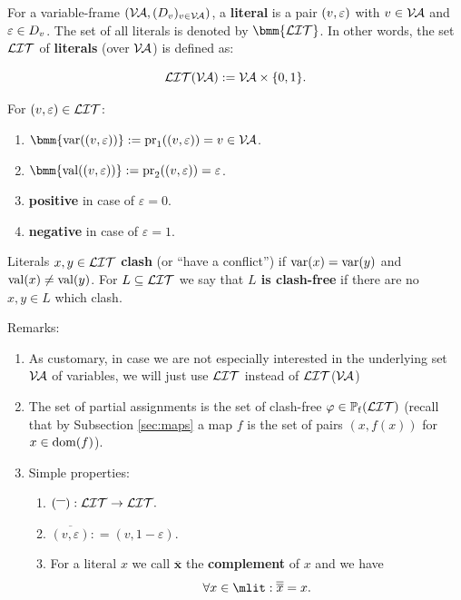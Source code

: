 \documentclass[12pt]{book}
\begin{document}
\begin{defi}\label{def:litdervar}
  For a variable-frame $(\mathcal{V\hspace{-0.1em}A}, (D_v)_{v \in \mathcal{V\hspace{-0.1em}A}})$, a \textbf{literal} is a pair $(v,\varepsilon)$ with $v \in \mathcal{V\hspace{-0.1em}A}$ and $\varepsilon \in D_v$. The set of all literals is denoted by $\bmm{\Lit}$. In other words, the set $\mathcal{LIT}$ of \textbf{literals} (over $\mathcal{V\hspace{-0.1em}A}$) is defined as:

\begin{displaymath}
 \mathcal{LIT}( \mathcal{V\hspace{-0.1em}A}): = \mathcal{V\hspace{-0.1em}A} \times \{0,1\}.
 \end{displaymath}

For $(v,\varepsilon) \in \mathcal{LIT}$:
  \begin{enumerate}
  \item $\bmm{\var((v,\ve))} := \proj_1((v,\ve)) = v \in \Va$.
  \item $\bmm{\val((v,\ve))} := \proj_2((v,\ve)) = \ve$.
  \item \textbf{positive} in case of $\varepsilon = 0$.
  \item \textbf{negative} in case of $\varepsilon = 1$.
  \end{enumerate}
  Literals $x, y \in \mathcal{LIT}$ \textbf{clash} (or ``have a conflict'') if $\operatorname{var}(x) = \operatorname{var}(y)$ and $\operatorname{val}(x) \ne \operatorname{val}(y)$. For $L \subseteq \mathcal{LIT}$ we say that \textbf{$L$ is clash-free} if there are no $x, y \in L$ which clash.
\end{defi}
Remarks:
\begin{enumerate}
\item As customary, in case we are not especially interested in the underlying set   $\mathcal{V\hspace{-0.1em}A}$ of variables, we will just use  $\mathcal{LIT}$ instead of $\mathcal{LIT}$($\mathcal{V\hspace{-0.1em}A}$)
\item The set of partial assignments is the set of clash-free $\varphi \in \operatorname{\mathbb{P}_f}(\mathcal{LIT})$ (recall that by Subsection \ref{sec:maps} a map $f$ is the set of pairs $(x,f(x))$ for $x \in \operatorname{dom}(f)$).

\item Simple properties:
     \begin{enumerate}
      \item $({}^{\overline{~~}}): \mathcal{LIT} \to  \mathcal{LIT}.$
      \item $\overline{(v, \varepsilon)}: = (v, 1-\varepsilon).$
      \item For a literal $x$ we call $\overline{{\bm x}}$ the \textbf{complement} of $x$ and we have
      \begin{displaymath}
      \forall x \in \mlit: \overline{\overline{x}} = x.
      \end{displaymath}
     \end{enumerate}
\end{enumerate}
\end{document}
